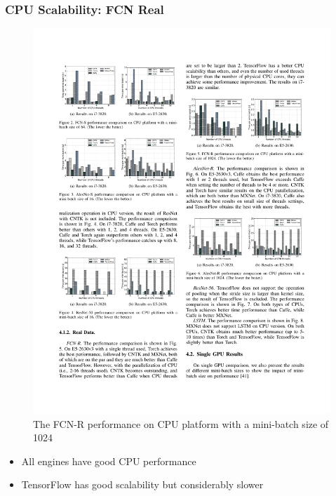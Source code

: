 \begin{frame}
	\MyLogo
	\frametitle{CPU Scalability: FCN Real}  
	\begin{figure}[htbp] 
		\includegraphics[width=\linewidth]{figures/FCN-R1.pdf} 
		\caption{The FCN-R performance on CPU platform with a mini-batch size of 1024}
	\end{figure}
	
\vskip -10pt
\begin{mdframed}[style=mystyle1]
\begin{itemize}
\item All engines have good CPU performance
\item TensorFlow has good scalability but considerably slower
\end{itemize}
\end{mdframed}

\end{frame}


